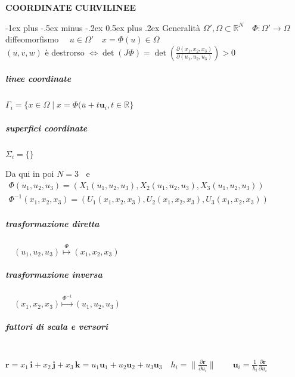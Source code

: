 \documentclass[10pt,landscape]{article}
\makeatletter
\renewcommand{\section}{\@startsection{section}{1}{0mm}%
                                {-1ex plus -.5ex minus -.2ex}%
                                {0.5ex plus .2ex}%
                                {\normalfont\large\bfseries}}
\newcommand{\fracp}[2]{\frac{\partial #1}{\partial #2}}
\makeatother
\begin{document}
\raggedright
\footnotesize

\begin{center}
\Large\textbf{COORDINATE CURVILINEE}
\end{center}
\begin{multicols*}{2}
\setlength{\premulticols}{1pt}
\setlength{\postmulticols}{1pt}
\setlength{\multicolsep}{1pt}
\setlength{\columnsep}{2pt}

\section{Generalità}
$\Omega',\Omega \subset \mathbb{R}^N\quad \Phi:\Omega' \rightarrow \Omega$ diffeomorfismo $\quad u\in \Omega' \quad x=\Phi(u)\in \Omega$\\

$(u,v,w)$ è destrorso $\Longleftrightarrow \det(J\Phi)=\det \left(\fracp{(x_1,x_2,x_3)}{(u_1,u_2,u_3)}\right)>0$\\

\subparagraph{linee coordinate} $\Gamma_i=\{x\in \Omega\;|\;x=\Phi(\bar u+t\mathbf u_i,t\in\mathbb{R}\}$\\
\subparagraph{superfici coordinate} $\Sigma_i=\{\}$\\\;

Da qui in poi $N=3\;\;$ e $\begin{array}{l}\Phi(u_1,u_2,u_3)=(X_1(u_1,u_2,u_3),X_2(u_1,u_2,u_3),X_3(u_1,u_2,u_3))\\ \Phi^{-1}(x_1,x_2,x_3)=(U_1(x_1,x_2,x_3),U_2(x_1,x_2,x_3),U_3(x_1,x_2,x_3))\end{array}$\\

\subparagraph{trasformazione diretta}$\quad (u_1,u_2,u_3)\overset{\Phi}{\mapsto}(x_1,x_2,x_3)$\\
\subparagraph{trasformazione inversa}$\quad (x_1,x_2,x_3)\overset{\Phi^{-1}}{\mapsto}(u_1,u_2,u_3)$\\\;

\subparagraph{fattori di scala e versori}\mbox{}\\
$\mathbf r =x_1\,\mathbf i+x_2\,\mathbf j+x_3\,\mathbf k=u_1\mathbf u_1+u_2\mathbf u_2+u_3\mathbf u_3
\quad h_i=\|\frac{\partial \mathbf r}{\partial u_i}\|%
\qquad\mathbf u_i=\frac 1{h_i}\fracp{\mathbf r}{u_i}$\\\;


\end{multicols*}
\end{document}
